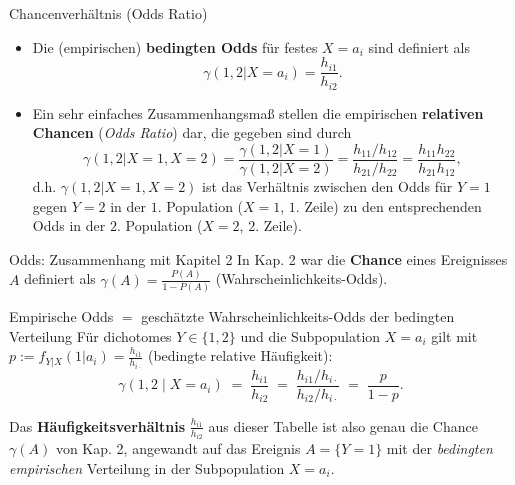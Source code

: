 \documentclass[
  10pt,
  ignorenonframetext,
]{beamer}
\providecommand{\tightlist}{%
  \setlength{\itemsep}{0pt}\setlength{\parskip}{0pt}}
\begin{document}
\begin{frame}{Chancenverhältnis (Odds Ratio)}
\protect\hypertarget{chancenverhuxe4ltnis-odds-ratio}{}
\begin{itemize}
\tightlist
\item
  Die (empirischen) \textbf{bedingten Odds} für festes \(X=a_i\) sind
  definiert als \begin{displaymath}
   \gamma(1,2|X=a_i) = \frac{h_{i1}}{h_{i2}}.
    \end{displaymath}
\item
  Ein sehr einfaches Zusammenhangsmaß stellen die empirischen
  \textbf{relativen Chancen} (\emph{Odds Ratio}) dar, die gegeben sind
  durch \begin{displaymath}
   \gamma(1,2|X=1,X=2) = \frac{\gamma(1,2|X=1)}{\gamma(1,2|X=2)} =
   \frac{h_{11}/h_{12}} {h_{21}/h_{22}} = \frac{h_{11}h_{22}}{h_{21}h_{12}},
    \end{displaymath} d.h. \(\gamma(1,2|X=1,X=2)\) ist das Verhältnis
  zwischen den Odds für \(Y=1\) gegen \(Y=2\) in der \(1.\) Population
  (\(X=1\), \(1.\) Zeile) zu den entsprechenden Odds in der \(2.\)
  Population (\(X=2\), \(2.\) Zeile).
\end{itemize}
\end{frame}

\begin{frame}{Odds: Zusammenhang mit Kapitel 2}
\protect\hypertarget{odds-zusammenhang-mit-kapitel-2}{}
In Kap. 2 war die \textbf{Chance} eines Ereignisses \(A\) definiert als
\(\gamma(A) = \frac{P(A)}{1-P(A)}\) (Wahrscheinlichkeits-Odds).

\begin{block}{Empirische Odds \(=\) geschätzte Wahrscheinlichkeits-Odds
der bedingten Verteilung}
\protect\hypertarget{empirische-odds-geschuxe4tzte-wahrscheinlichkeits-odds-der-bedingten-verteilung}{}
Für dichotomes \(Y \in \{1, 2\}\) und die Subpopulation \(X = a_i\) gilt
mit \(p := f_{Y|X}(1|a_i) = \frac{h_{i1}}{h_{i\cdot}}\) (bedingte
relative Häufigkeit): \[
\gamma(1,2 \mid X = a_i) \;=\; \frac{h_{i1}}{h_{i2}}
\;=\; \frac{h_{i1}/h_{i\cdot}}{h_{i2}/h_{i\cdot}}
\;=\; \frac{p}{1-p}.
\]
\end{block}

Das \textbf{Häufigkeitsverhältnis} \(\tfrac{h_{i1}}{h_{i2}}\) aus dieser
Tabelle ist also genau die Chance \(\gamma(A)\) von Kap. 2, angewandt
auf das Ereignis \(A = \{Y=1\}\) mit der \emph{bedingten empirischen}
Verteilung in der Subpopulation \(X = a_i\).
\end{frame}
\end{document}
